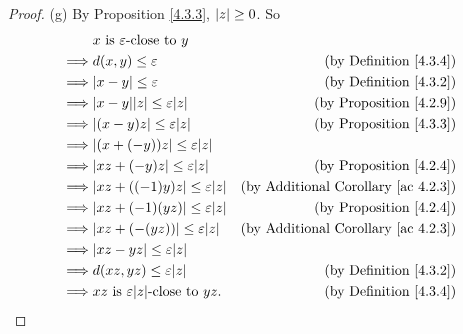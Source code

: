 \begin{proof}{(g)}
    By Proposition \ref{4.3.3}, \(\abs*{z} \geq 0\).
    So
    \begin{align*}
                 & x \text{ is } \varepsilon\text{-close to } y                                                              \\
        \implies & d(x, y) \leq \varepsilon                                & \text{(by Definition \ref{4.3.4})}              \\
        \implies & \abs*{x - y} \leq \varepsilon                           & \text{(by Definition \ref{4.3.2})}              \\
        \implies & \abs*{x - y}\abs*{z} \leq \varepsilon\abs*{z}           & \text{(by Proposition \ref{4.2.9})}             \\
        \implies & \abs*{(x - y)z} \leq \varepsilon\abs*{z}                & \text{(by Proposition \ref{4.3.3})}             \\
        \implies & \abs*{(x + (-y))z} \leq \varepsilon\abs*{z}                                                               \\
        \implies & \abs*{xz + (-y)z} \leq \varepsilon\abs*{z}              & \text{(by Proposition \ref{4.2.4})}             \\
        \implies & \abs*{xz + ((-1)y)z} \leq \varepsilon\abs*{z}           & \text{(by Additional Corollary \ref{ac 4.2.3})} \\
        \implies & \abs*{xz + (-1)(yz)} \leq \varepsilon\abs*{z}           & \text{(by Proposition \ref{4.2.4})}             \\
        \implies & \abs*{xz + (-(yz))} \leq \varepsilon\abs*{z}            & \text{(by Additional Corollary \ref{ac 4.2.3})} \\
        \implies & \abs*{xz - yz} \leq \varepsilon\abs*{z}                                                                   \\
        \implies & d(xz, yz) \leq \varepsilon\abs*{z}                      & \text{(by Definition \ref{4.3.2})}              \\
        \implies & xz \text{ is } \varepsilon\abs*{z}\text{-close to } yz. & \text{(by Definition \ref{4.3.4})}              \\
    \end{align*}
\end{proof}

